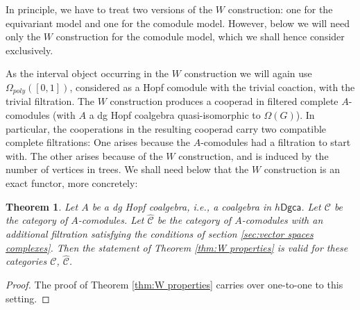 \documentclass[a4paper]{amsart}
\theoremstyle{plain}
\newtheorem{thm}{Theorem}
\theoremstyle{definition}
\newcommand{\op}{\mathcal}
\newcommand{\dgca}{\mathsf{Dgca}}
\renewcommand{\mod}{\mathrm{mod}}
\newcommand{\mC}{{\mathcal{C}}}
\newcommand{\hdgca}{h\dgca}
\begin{document}
In principle, we have to treat two versions of the $W$ construction: one for the equivariant model and one for the comodule model.
However, below we will need only the $W$ construction for the comodule model, which we shall hence consider exclusively.
% 

As the interval object occurring in the $W$ construction we will again use $\Omega_{poly}([0,1])$, considered as a Hopf comodule with the trivial coaction, with the trivial filtration.
The $W$ construction produces a cooperad in filtered complete $A$-comodules (with $A$ a dg Hopf coalgebra quasi-isomorphic to $\Omega(G)$).
In particular, the cooperations in the resulting cooperad carry two compatible complete filtrations: One arises because the $A$-comodules had a filtration to start with.
The other arises because of the $W$ construction, and is induced by the number of vertices in trees.
We shall need below that the $W$ construction is an exact functor, more concretely:
\begin{thm}\label{thm:W for comodule op}
 Let $A$ be a dg Hopf coalgebra, i.e., a coalgebra in $\hdgca$. Let $\mC$ be the category of $A$-comodules. Let $\hat \mC$ be the category of $A$-comodules with an additional filtration satisfying the conditions of section \ref{sec:vector spaces complexes}.
Then the statement of Theorem \ref{thm:W properties} is valid for these categories $\mC$, $\hat \mC$.
\end{thm}
\begin{proof}
 The proof of Theorem \ref{thm:W properties} carries over one-to-one to this setting.
\end{proof}




% 
% 
% 
\end{document}
